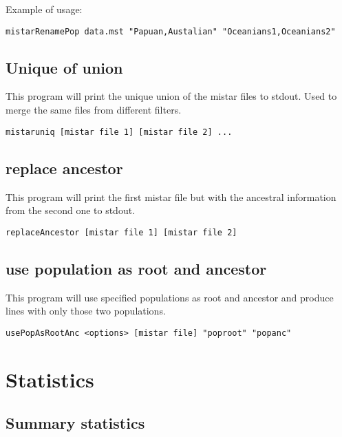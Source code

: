\documentclass[a4paper]{article}
\begin{document}
Example of usage:
\begin{lstlisting}
mistarRenamePop data.mst "Papuan,Austalian" "Oceanians1,Oceanians2"
\end{lstlisting}



\subsection{Unique of union}

\noindent This program will print the unique union of the mistar files to stdout. Used to merge the same files from different filters.

\begin{lstlisting}
mistaruniq [mistar file 1] [mistar file 2] ...
\end{lstlisting}


\subsection{replace ancestor}

\noindent This program will print the first mistar file but with the ancestral information from the second one to stdout.

\begin{lstlisting}
replaceAncestor [mistar file 1] [mistar file 2]
\end{lstlisting}


\subsection{use population as root and ancestor}

\noindent This program will use specified populations as root and ancestor and produce lines with only those two populations.

\begin{lstlisting}
usePopAsRootAnc <options> [mistar file] "poproot" "popanc"
\end{lstlisting}



\section{Statistics}



\subsection{Summary statistics}
\end{document}
